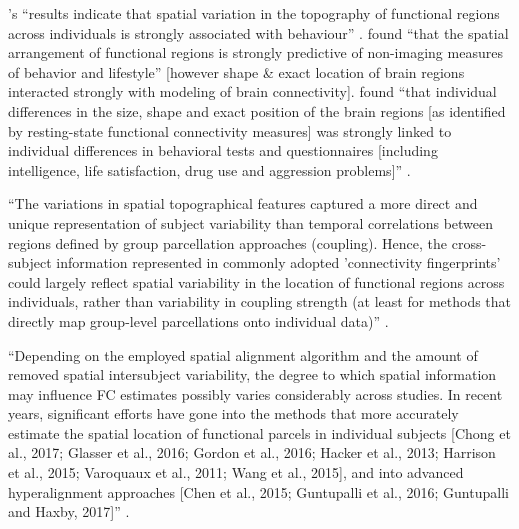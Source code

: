 %
\citep{bijsterbosch2018relationship}'s ``results indicate that spatial variation
in the topography of functional regions across individuals is strongly
associated with behaviour'' \citep{bijsterbosch2018relationship}.
%
\citet{bijsterbosch2018relationship} found ``that the spatial arrangement of
functional regions is strongly predictive of non-imaging measures of behavior
and lifestyle'' [however shape \& exact location of brain regions interacted
strongly with  modeling of brain connectivity].
%
\citet{bijsterbosch2018relationship} found ``that individual differences in the
size, shape and exact position of the brain regions [as identified by
resting-state functional connectivity measures] was strongly linked to
individual differences in behavioral tests and questionnaires [including
intelligence, life satisfaction, drug use and aggression problems]''
\citep{bijsterbosch2018relationship}.

%
``The variations in spatial topographical features captured a more direct and
unique representation of subject variability than temporal correlations between
regions defined by group parcellation approaches (coupling).
%
Hence, the cross-subject information represented in commonly adopted
'connectivity fingerprints' could largely reflect spatial variability in the
location of functional regions across individuals, rather than variability in
coupling strength (at least for methods that directly map group-level
parcellations onto individual data)'' \citep{bijsterbosch2018relationship}.

%
``Depending on the employed spatial alignment algorithm and the amount of
removed spatial intersubject variability, the degree to which spatial
information may influence FC estimates possibly varies considerably across
studies.
%
In recent years, significant efforts have gone into the methods that more
accurately estimate the spatial location of functional parcels in individual
subjects [Chong et al., 2017; Glasser et al., 2016; Gordon et al., 2016; Hacker
et al., 2013; Harrison et al., 2015; Varoquaux et al., 2011; Wang et al., 2015],
and into advanced hyperalignment approaches [Chen et al., 2015; Guntupalli et
al., 2016; Guntupalli and Haxby, 2017]'' \citep{bijsterbosch2018relationship}.
